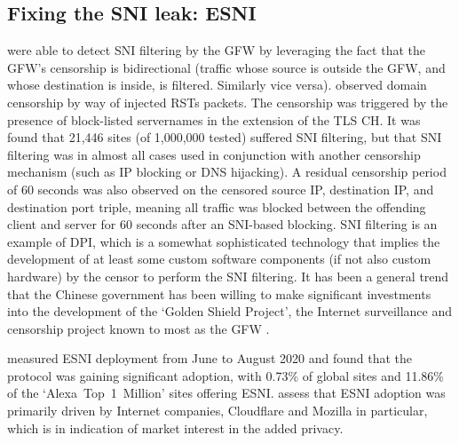 \subsection{Fixing the SNI leak: ESNI}


\cite{chai2019importance} were able to detect \ac{SNI} filtering by the \ac{GFW} by leveraging the fact that the \ac{GFW}'s censorship is bidirectional (traffic whose source is outside the \ac{GFW}, and whose destination is inside, is filtered. Similarly vice versa).
\cite{chai2019importance} observed domain censorship by way of injected \acp{RST} packets.
The censorship was triggered by the presence of block-listed servernames in the  extension of the \ac{TLS} \ac{CH}.
It was found that 21,446 sites (of 1,000,000 tested) suffered \ac{SNI} filtering,
but that \ac{SNI} filtering was in almost all cases used in conjunction with another censorship mechanism
(such as \ac{IP} blocking or \ac{DNS} hijacking).
A residual censorship period of 60 seconds was also observed on the censored source IP, destination IP, and destination port triple, meaning all traffic was blocked between the offending client and server for 60 seconds after an \ac{SNI}-based blocking.
\ac{SNI} filtering is an example of \ac{DPI},
which is a somewhat sophisticated technology that implies the development of at least
some custom software components
(if not also custom hardware)
by the censor to perform the \ac{SNI} filtering.
It has been a general trend that the Chinese
government has been willing to make
significant investments into the development
of the `Golden Shield Project',
the Internet surveillance and censorship project
known to most as the \ac{GFW} \citep{chandel-2019-great-firewall}.



\cite{guan2021largescalemeasurementofesni} measured \ac{ESNI} deployment from June to August 2020 and found that the protocol was gaining significant adoption, with 0.73\% of global sites and 11.86\% of the `Alexa~Top~1~Million' sites offering \ac{ESNI}. \cite{guan2021largescalemeasurementofesni} assess that \ac{ESNI} adoption was primarily driven by Internet companies, Cloudflare and Mozilla in particular, which is in indication of market interest in the added privacy.

